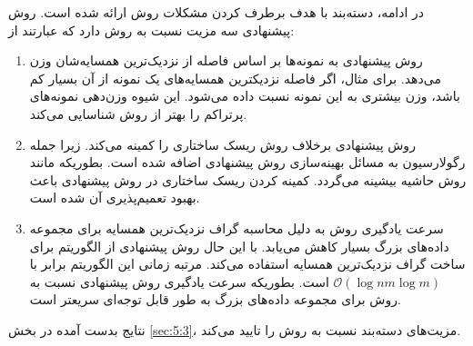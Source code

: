 در ادامه، دسته‌بند  با هدف برطرف کردن مشکلات روش  ارائه شده است. روش پیشنهادی  سه مزیت نسبت به روش   دارد که عبارتند از:
\begin{enumerate}
	\item روش پیشنهادی به نمونه‌ها بر اساس فاصله از نزدیک‌ترین همسایه‌شان وزن می‌دهد. برای مثال، اگر  فاصله نزدیکترین همسایه‌های یک نمونه از آن بسیار کم باشد، وزن بیشتری به این نمونه نسبت داده می‌شود. این شیوه وزن‌دهی نمونه‌های پرتراکم را بهتر  از روش  شناسایی می‌کند.
	\item روش پیشنهادی  برخلاف روش  ریسک ساختاری را کمینه می‌کند. زیرا جمله رگولارسیون به مسائل بهینه‌سازی روش پیشنهادی اضافه شده است. بطوریکه مانند روش   حاشیه بیشینه می‌گردد. کمینه کردن ریسک ساختاری در روش پیشنهادی باعث بهبود تعمیم‌پذیری آن شده است.
	\item سرعت یادگیری روش  به دلیل محاسبه گراف نزدیک‌ترین همسایه برای مجموعه داده‌های بزرگ بسیار کاهش می‌یابد. با  این حال روش پیشنهادی از الگوریتم  برای ساخت گراف نزدیک‌ترین همسایه استفاده می‌کند. مرتبه زمانی این الگوریتم برابر با   $\mathcal{O}(\log nm\log m)$ است. بطوریکه سرعت یادگیری روش پیشنهادی نسبت به روش  برای مجموعه داده‌های بزرگ به طور قابل    توجه‌ای سریعتر است. 
\end{enumerate} 

نتایج بدست آمده در بخش \ref{sec:5:3}، مزیت‌های دسته‌بند  نسبت به روش  را تایید می‌کند.

